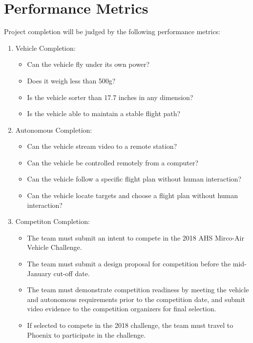 \documentclass[letterpaper,10pt,titlepage]{article}
\begin{document}
\section*{Performance Metrics}\par
\hspace{4ex}Project completion will be judged by the following performance 
metrics:
\begin{enumerate}
\item Vehicle Completion:
\begin{itemize}
\item Can the vehicle fly under its own power?
\item Does it weigh less than 500g?
\item Is the vehicle sorter than 17.7 inches in any dimension?
\item Is the vehicle able to maintain a stable flight path?
\end{itemize}
\item Autonomous Completion:
\begin{itemize}
\item Can the vehicle stream video to a remote station?
\item Can the vehicle be controlled remotely from a computer?
\item Can the vehicle follow a specific flight plan without human interaction?
\item Can the vehicle locate targets and choose a flight plan without human
interaction?
\end{itemize}
\item Competiton Completion:
\begin{itemize}
\item The team must submit an intent to compete in the 2018 AHS Mirco-Air Vehicle 
Challenge.
\item The team must submit a design proposal for competition before the mid-
January cut-off date. 
\item The team must demonstrate competition readiness by meeting the vehicle and 
autonomous requirements prior to the competition date, and submit video evidence 
to the competition organizers for final selection.
\item If selected to compete in the 2018 challenge, the team must travel to 
Phoenix to participate in the challenge. 
\end{itemize}
\end{enumerate}
\end{document}
